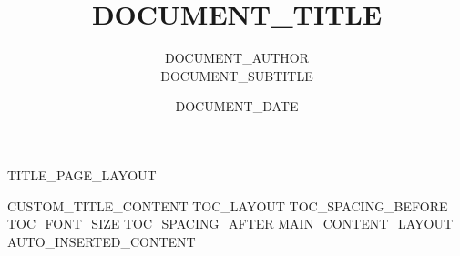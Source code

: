 \documentclass[{{DOCUMENT_CLASS_OPTIONS}}]{ctexart}
\title{\Large\textbf{{{DOCUMENT_TITLE}}}}
\author{{{DOCUMENT_AUTHOR}} \\ \normalsize {{{DOCUMENT_SUBTITLE}}}}
\date{{{DOCUMENT_DATE}}}
\begin{document}
{{TITLE_PAGE_LAYOUT}}
\maketitle
{{CUSTOM_TITLE_CONTENT}}
\newpage
{{TOC_LAYOUT}}
{{TOC_SPACING_BEFORE}}
{{TOC_FONT_SIZE}}\tableofcontents
{{TOC_SPACING_AFTER}}
\newpage
{{MAIN_CONTENT_LAYOUT}}
{{AUTO_INSERTED_CONTENT}}
\end{document}
